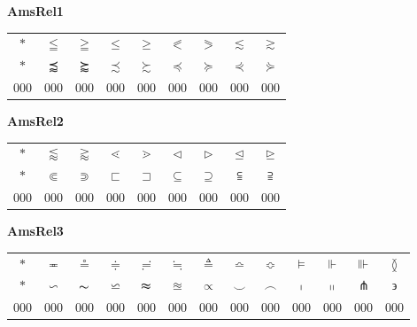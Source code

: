 \documentclass[12pt]{report}
\newlength{\mine}
\newlength{\niz}
\def\pmb{}
\begin{document}
\textbf{AmsRel1}
\par\nobreak\vspace{2mm}
\begin{tabular}{|c|cccccccc|}
  \hline
   $\pmb *$&
   $\pmb\leqq $&
   $\pmb\geqq $&
   $\pmb\leqslant $&
   $\pmb\geqslant $&
   $\pmb\eqslantless $&
   $\pmb\eqslantgtr $&
   $\pmb\lesssim $&
   $\pmb\gtrsim $\\[\mine]
   $\pmb *$&
   $\pmb\precapprox $&
   $\pmb\succapprox $&
   $\pmb\precsim $&
   $\pmb\succsim $&
   $\pmb\preccurlyeq $&
   $\pmb\succcurlyeq $&
   $\pmb\curlyeqprec $&
   $\pmb\curlyeqsucc $\\[\niz]
  \hline\hline
  000&000&000&000&000&000&000&000&000\\
  \hline
\end{tabular}
\goodbreak\par\vspace{3mm}

\textbf{AmsRel2}
\par\nobreak\vspace{2mm}
\begin{tabular}{|c|cccccccc|}
  \hline
   $\pmb *$&
   $\pmb\lessapprox $&
   $\pmb\gtrapprox $&
   $\pmb\lessdot $&
   $\pmb\gtrdot $&
   $\pmb\vartriangleleft $&
   $\pmb\vartriangleright $&
   $\pmb\trianglelefteq $&
   $\pmb\trianglerighteq $\\[\mine]
   $\pmb *$&
   $\pmb\Subset $&
   $\pmb\Supset $&
   $\pmb\sqsubset $&
   $\pmb\sqsupset $&
   $\pmb\subseteq $&
   $\pmb\supseteq $&
   $\pmb\subseteqq $&
   $\pmb\supseteqq $\\[\niz]
  \hline\hline
  000&000&000&000&000&000&000&000&000\\
  \hline
\end{tabular}
\goodbreak\par\vspace{3mm}

\textbf{AmsRel3}
\par\nobreak\vspace{2mm}
\begin{tabular}{|c|cccccccccccc|}
  \hline
   $\pmb *$&
   $\pmb\eqcirc $&
   $\pmb\circeq $&
   $\pmb\doteqdot $&
   $\pmb\risingdotseq $&
   $\pmb\fallingdotseq $&
   $\pmb\triangleq $&
   $\pmb\bumpeq $&
   $\pmb\Bumpeq $&
   $\pmb\vDash $&
   $\pmb\Vdash $&
   $\pmb\Vvdash $&
   $\pmb\between $\\[\mine]
   $\pmb *$&
   $\pmb\backsim $&
   $\pmb\thicksim $&
   $\pmb\backsimeq $&
   $\pmb\thickapprox $&
   $\pmb\approxeq $&
   $\pmb\varpropto $&
   $\pmb\smallsmile $&
   $\pmb\smallfrown $&
   $\pmb\shortmid $&
   $\pmb\shortparallel $&
   $\pmb\pitchfork $&
   $\pmb\backepsilon $\\[\niz]
  \hline\hline
  000&000&000&000&000&000&000&000&000&000&000&000&000\\
  \hline
\end{tabular}
\goodbreak\par\vspace{3mm}
\end{document}
